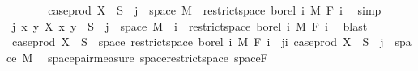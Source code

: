 \begin{isabellebody}
\ \ \ \ \isamarkupfalse%
\ \isamarkupfalse%
\ {\isachardoublequoteopen}case{\isacharunderscore}{\kern0pt}prod\ X\ {\isacharminus}{\kern0pt}{\isacharbackquote}{\kern0pt}\ S\ {\isasyminter}\ {\isacharbraceleft}{\kern0pt}j{\isacharbraceright}{\kern0pt}\ {\isasymtimes}\ space\ M\ {\isasymin}\ restrict{\isacharunderscore}{\kern0pt}space\ borel\ {\isacharbraceleft}{\kern0pt}{}{\isachardot}{\kern0pt}{\isachardot}{\kern0pt}i{\isacharbraceright}{\kern0pt}\ {\isasymOtimes}\isactrlsub M\ F\ i{\isachardoublequoteclose}\ \isamarkupfalse%
\ simp\isanewline
\ \ \isacommand{{\isacharbraceright}{\kern0pt}}\isamarkupfalse%
\isanewline
\ \ \isamarkupfalse%
\ {\isachardoublequoteopen}{\isacharparenleft}{\kern0pt}{\isasymlambda}j{\isachardot}{\kern0pt}\ {\isacharparenleft}{\kern0pt}{\isasymlambda}{\isacharparenleft}{\kern0pt}x{\isacharcomma}{\kern0pt}\ y{\isacharparenright}{\kern0pt}{\isachardot}{\kern0pt}\ X\ x\ y{\isacharparenright}{\kern0pt}\ {\isacharminus}{\kern0pt}{\isacharbackquote}{\kern0pt}\ S\ {\isasyminter}\ {\isacharbraceleft}{\kern0pt}j{\isacharbraceright}{\kern0pt}\ {\isasymtimes}\ space\ M{\isacharparenright}{\kern0pt}\ {\isacharbackquote}{\kern0pt}\ {\isacharbraceleft}{\kern0pt}{\isachardot}{\kern0pt}{\isachardot}{\kern0pt}i{\isacharbraceright}{\kern0pt}\ {\isasymsubseteq}\ restrict{\isacharunderscore}{\kern0pt}space\ borel\ {\isacharbraceleft}{\kern0pt}{}{\isachardot}{\kern0pt}{\isachardot}{\kern0pt}i{\isacharbraceright}{\kern0pt}\ {\isasymOtimes}\isactrlsub M\ F\ i{\isachardoublequoteclose}\ \isamarkupfalse%
\ blast\isanewline
\ \ \isamarkupfalse%
\ \isamarkupfalse%
\ {\isachardoublequoteopen}case{\isacharunderscore}{\kern0pt}prod\ X\ {\isacharminus}{\kern0pt}{\isacharbackquote}{\kern0pt}\ S\ {\isasyminter}\ space\ {\isacharparenleft}{\kern0pt}restrict{\isacharunderscore}{\kern0pt}space\ borel\ {\isacharbraceleft}{\kern0pt}{}{\isachardot}{\kern0pt}{\isachardot}{\kern0pt}i{\isacharbraceright}{\kern0pt}\ {\isasymOtimes}\isactrlsub M\ F\ i{\isacharparenright}{\kern0pt}\ {\isacharequal}{\kern0pt}\ {\isacharparenleft}{\kern0pt}{\isasymUnion}j{\isasymle}i{\isachardot}{\kern0pt}\ case{\isacharunderscore}{\kern0pt}prod\ X\ {\isacharminus}{\kern0pt}{\isacharbackquote}{\kern0pt}\ S\ {\isasyminter}\ {\isacharbraceleft}{\kern0pt}j{\isacharbraceright}{\kern0pt}\ {\isasymtimes}\ space\ M{\isacharparenright}{\kern0pt}{\isachardoublequoteclose}\ \isamarkupfalse%
\ space{\isacharunderscore}{\kern0pt}pair{\isacharunderscore}{\kern0pt}measure\ space{\isacharunderscore}{\kern0pt}restrict{\isacharunderscore}{\kern0pt}space\ space{\isacharunderscore}{\kern0pt}F\ \isamarkupfalse%

\end{isabellebody}
